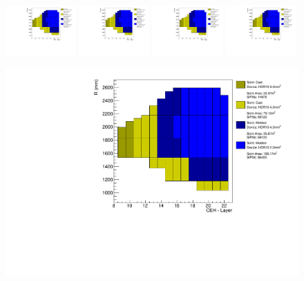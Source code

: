 \begin{figure}[!ht]
  \centering
  \includegraphics[trim={400 370 20 10},clip,width=0.24\textwidth]{figures/hgcal/plot_scenes/sceneA_jan20_fix_vto2p0_with9mm2.pdf}
  \includegraphics[trim={400 310 20 70},clip,width=0.24\textwidth]{figures/hgcal/plot_scenes/sceneA_jan20_fix_vto2p0_with9mm2.pdf}
  \includegraphics[trim={400 250 20 130},clip,width=0.24\textwidth]{figures/hgcal/plot_scenes/sceneA_jan20_fix_vto2p0_with9mm2.pdf}
  \includegraphics[trim={400 190 20 190},clip,width=0.24\textwidth]{figures/hgcal/plot_scenes/sceneA_jan20_fix_vto2p0_with9mm2.pdf}
  \begin{minipage}[c]{0.49\textwidth}
    \includegraphics[trim={0 0 165pt 0},clip,width=\textwidth]{figures/hgcal/plot_scenes/sceneA_jan20_fix_vto2p0_with9mm2.pdf}

\end{minipage}
\end{figure}
